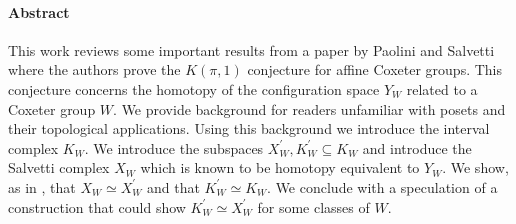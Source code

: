 \documentclass[class=guthesis, crop=false]{standalone}
\begin{document}
\paragraph{Abstract}
This work reviews some important results from a paper by Paolini and Salvetti \cite{paolini_salvetti_kpi1_2021} where the authors prove the $K(\pi,1)$ conjecture for affine Coxeter groups. This conjecture concerns the homotopy of the configuration space $Y_W$ related to a Coxeter group $W$. We provide background for readers unfamiliar with posets and their topological applications. Using this background we introduce the interval complex $K_W$. We introduce the subspaces $X^\prime_W, K^\prime_W \subseteq K_W$ and introduce the Salvetti complex $X_W$ which is known to be homotopy equivalent to $Y_W$. We show, as in \cite{paolini_salvetti_kpi1_2021}, that $X_W \simeq X^\prime_W$ and that $K^\prime_W \simeq K_W$. We conclude with a speculation of a construction that could show $K^\prime_W\simeq X^\prime_W$ for some classes of $W$. 
\end{document}
